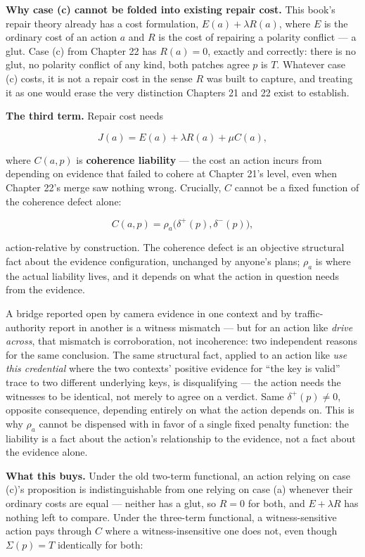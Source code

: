 \textbf{Why case (c) cannot be folded into existing repair cost.} This book's
repair theory already has a cost formulation, \(E(a) + \lambda R(a)\),
where \(E\) is the ordinary cost of an action \(a\) and \(R\) is the cost of
repairing a polarity conflict --- a glut. Case (c) from Chapter 22 has
\(R(a) = 0\), exactly and correctly: there is no glut, no polarity conflict
of any kind, both patches agree \(p\) is \(T\). Whatever case (c) costs, it
is not a repair cost in the sense \(R\) was built to capture, and treating
it as one would erase the very distinction Chapters 21 and 22 exist to
establish.

\textbf{The third term.} Repair cost needs

\[J(a) = E(a) + \lambda R(a) + \mu C(a),\]

where \(C(a,p)\) is \textbf{coherence liability} --- the cost an action incurs
from depending on evidence that failed to cohere at Chapter 21's level,
even when Chapter 22's merge saw nothing wrong. Crucially, \(C\) cannot be
a fixed function of the coherence defect alone:

\[C(a,p) = \rho_a\big(\delta^+(p), \delta^-(p)\big),\]

action-relative by construction. The coherence defect is an objective
structural fact about the evidence configuration, unchanged by anyone's
plans; \(\rho_a\) is where the actual liability lives, and it depends on
what the action in question needs from the evidence.

A bridge reported open by camera evidence in one context and by
traffic-authority report in another is a witness mismatch --- but for an
action like \emph{drive across}, that mismatch is corroboration, not
incoherence: two independent reasons for the same conclusion. The same
structural fact, applied to an action like \emph{use this credential} where
the two contexts' positive evidence for ``the key is valid'' trace to two
different underlying keys, is disqualifying --- the action needs the
witnesses to be identical, not merely to agree on a verdict. Same
\(\delta^+(p) \neq 0\), opposite consequence, depending entirely on what the
action depends on. This is why \(\rho_a\) cannot be dispensed with in favor
of a single fixed penalty function: the liability is a fact about the
action's relationship to the evidence, not a fact about the evidence
alone.

\textbf{What this buys.} Under the old two-term functional, an action relying
on case (c)'s proposition is indistinguishable from one relying on case
(a) whenever their ordinary costs are equal --- neither has a glut, so
\(R = 0\) for both, and \(E + \lambda R\) has nothing left to compare. Under
the three-term functional, a witness-sensitive action pays through \(C\)
where a witness-insensitive one does not, even though \(\Sigma(p) = T\)
identically for both:

